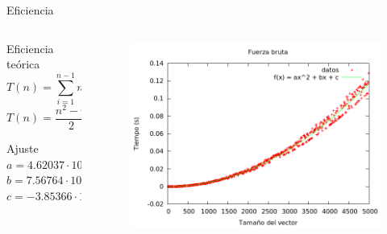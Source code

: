 \begin{frame}{Eficiencia}
\begin{columns}
	\begin{column}{5cm}
	\begin{block}{Eficiencia teórica}
	$$T(n) = \sum_{i=1}^{n-1}n-i$$
	$$T(n) = \frac{n^2 - n}{2} \longrightarrow O(n^2)$$
	\end{block}
	
	\begin{block}{Ajuste}
		$a = 4.62037 \cdot 10^{-9}$\\ $b = 7.56764 \cdot 10^{-9}$\\ $c = -3.85366 \cdot 10^{-5}$
	\end{block}
	\end{column}
	
	\begin{column}{6.5cm}
	\begin{figure}[h]
	\centering
		\includegraphics[width=1\textwidth]{../Opcional/Graficas/fuerza_bruta_bruno.png}
	\end{figure}
	\end{column}
\end{columns}
\end{frame}


